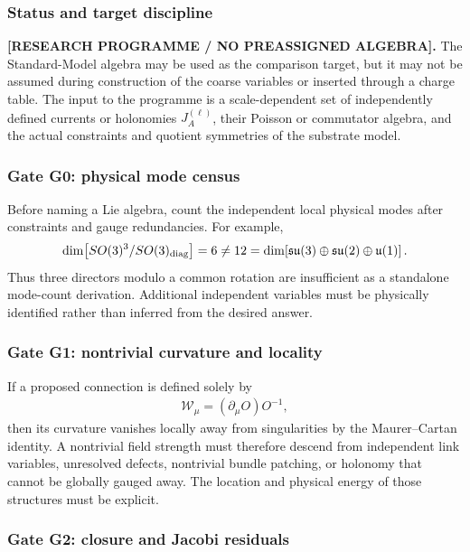 \subsubsection{Status and target discipline}

\textbf{[RESEARCH PROGRAMME / NO PREASSIGNED ALGEBRA].}
The Standard-Model algebra may be used as the comparison target, but it may not
be assumed during construction of the coarse variables or inserted through a
charge table.  The input to the programme is a scale-dependent set of
independently defined currents or holonomies \(J_A^{(\ell)}\), their Poisson or
commutator algebra, and the actual constraints and quotient symmetries of the
substrate model.

\subsubsection{Gate G0: physical mode census}

Before naming a Lie algebra, count the independent local physical modes after
constraints and gauge redundancies.  For example,
\begin{align}
    \dim\!\left[SO(3)^3/SO(3)_{\rm diag}\right]=6
    \neq
    12=
    \dim\!\left[\mathfrak{su}(3)\oplus\mathfrak{su}(2)\oplus\mathfrak u(1)\right].
    \label{eq:rt_gauge_mode_count_guard}
\end{align}
Thus three directors modulo a common rotation are insufficient as a standalone
mode-count derivation.  Additional independent variables must be physically
identified rather than inferred from the desired answer.

\subsubsection{Gate G1: nontrivial curvature and locality}

If a proposed connection is defined solely by
\begin{align}
    \mathcal W_\mu=(\partial_\mu O)O^{-1},
\end{align}
then its curvature vanishes locally away from singularities by the
Maurer--Cartan identity.  A nontrivial field strength must therefore descend
from independent link variables, unresolved defects, nontrivial bundle
patching, or holonomy that cannot be globally gauged away.  The location and
physical energy of those structures must be explicit.

\subsubsection{Gate G2: closure and Jacobi residuals}

